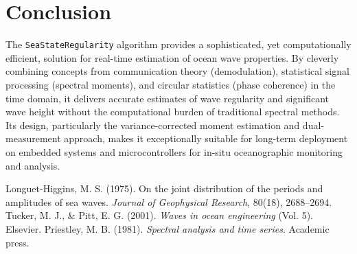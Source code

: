 \documentclass[11pt]{article}
\begin{document}
\section{Conclusion}
The \texttt{SeaStateRegularity} algorithm provides a sophisticated, yet computationally efficient, solution for real-time estimation of ocean wave properties. By cleverly combining concepts from communication theory (demodulation), statistical signal processing (spectral moments), and circular statistics (phase coherence) in the time domain, it delivers accurate estimates of wave regularity and significant wave height without the computational burden of traditional spectral methods. Its design, particularly the variance-corrected moment estimation and dual-measurement approach, makes it exceptionally suitable for long-term deployment on embedded systems and microcontrollers for in-situ oceanographic monitoring and analysis.

\begin{thebibliography}{9}
Longuet-Higgins, M. S. (1975). On the joint distribution of the periods and amplitudes of sea waves. \textit{Journal of Geophysical Research}, 80(18), 2688–2694.
Tucker, M. J., \& Pitt, E. G. (2001). \textit{Waves in ocean engineering} (Vol. 5). Elsevier.
Priestley, M. B. (1981). \textit{Spectral analysis and time series}. Academic press.
\end{thebibliography}
\end{document}
